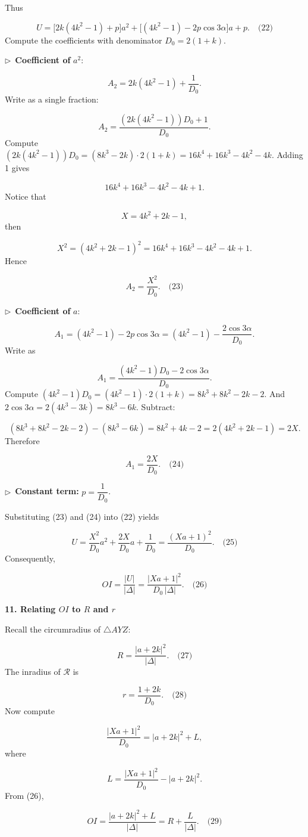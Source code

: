 \documentclass{llmxive}
\providecommand{\solutionheading}[1]{\par\smallskip\noindent\textbf{#1}\par}
\providecommand{\compactbullet}[1]{\par\noindent$\triangleright$~#1\par}
\begin{document}
Thus\par
\[
U = \bigl[2k(4k^2-1) + p\bigr] a^2 + \bigl[(4k^2-1) - 2p\cos3\alpha\bigr] a + p. \quad\text{(22)}
\]
Compute the coefficients with denominator \(D_0 = 2(1+k)\).\par
\compactbullet{\textbf{Coefficient of }\(a^2\):\textbf{}}
\[
  A_2 = 2k(4k^2-1) + \frac{1}{D_0}.
  \]
Write as a single fraction:\par
\[
  A_2 = \frac{(2k(4k^2-1)) D_0 + 1}{D_0}.
  \]
Compute \((2k(4k^2-1)) D_0 = (8k^3-2k) \cdot 2(1+k) = 16k^4 + 16k^3 - 4k^2 - 4k.\) Adding 1 gives\par
\[
  16k^4 + 16k^3 - 4k^2 - 4k + 1.
  \]
Notice that\par
\[
  X = 4k^2 + 2k - 1,
  \]
then\par
\[
  X^2 = (4k^2+2k-1)^2 = 16k^4 + 16k^3 - 4k^2 - 4k + 1.
  \]
Hence\par
\[
  A_2 = \frac{X^2}{D_0}. \quad\text{(23)}
  \]
\compactbullet{\textbf{Coefficient of }\(a\):\textbf{}}
\[
  A_1 = (4k^2-1) - 2p\cos3\alpha = (4k^2-1) - \frac{2\cos3\alpha}{D_0}.
  \]
Write as\par
\[
  A_1 = \frac{(4k^2-1)D_0 - 2\cos3\alpha}{D_0}.
  \]
Compute \((4k^2-1)D_0 = (4k^2-1)\cdot 2(1+k) = 8k^3 + 8k^2 - 2k - 2.\) And \(2\cos3\alpha = 2(4k^3-3k) = 8k^3 - 6k.\) Subtract:\par
\[
  (8k^3+8k^2-2k-2) - (8k^3-6k) = 8k^2 + 4k - 2 = 2(4k^2+2k-1) = 2X.
  \]
Therefore\par
\[
  A_1 = \frac{2X}{D_0}. \quad\text{(24)}
  \]
\compactbullet{\textbf{Constant term:} \(p = \dfrac{1}{D_0}\).}
Substituting (23) and (24) into (22) yields\par
\[
U = \frac{X^2}{D_0} a^2 + \frac{2X}{D_0} a + \frac{1}{D_0} = \frac{(X a + 1)^2}{D_0}. \quad\text{(25)}
\]
Consequently,\par
\[
OI = \frac{|U|}{|\Delta|} = \frac{|X a + 1|^2}{D_0\, |\Delta|}. \quad\text{(26)}
\]
\smallskip
\solutionheading{11. Relating \(OI\) to \(R\) and \(r\)}
Recall the circumradius of \(\triangle AYZ\):\par
\[
R = \frac{|a+2k|^2}{|\Delta|}. \quad\text{(27)}
\]
The inradius of \(\mathcal{R}\) is\par
\[
r = \frac{1+2k}{D_0}. \quad\text{(28)}
\]
Now compute\par
\[
\frac{|X a + 1|^2}{D_0} = |a+2k|^2 + L,
\]
where\par
\[
L = \frac{|X a + 1|^2}{D_0} - |a+2k|^2.
\]
From (26),\par
\[
OI = \frac{|a+2k|^2 + L}{|\Delta|} = R + \frac{L}{|\Delta|}. \quad\text{(29)}
\]
\end{document}
